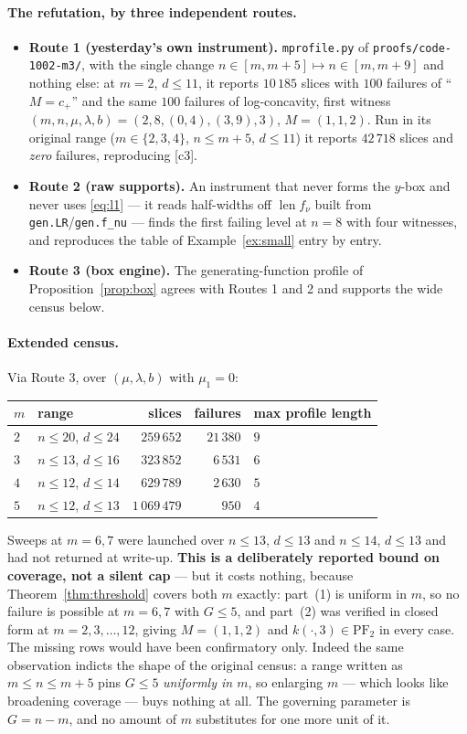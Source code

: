 \documentclass[11pt]{article}
\theoremstyle{definition}
\newcommand{\PFtwo}{\mathrm{PF}_2}
\begin{document}
\paragraph{The refutation, by three independent routes.}
\begin{itemize}
\item \textbf{Route 1 (yesterday's own instrument).} \verb|mprofile.py| of
\verb|proofs/code-1002-m3/|, with the single change $n\in[m,m+5]\mapsto n\in[m,m+9]$ and
nothing else: at $m=2$, $d\le11$, it reports $10\,185$ slices with $100$ failures of
``$M=c_+$'' and the same $100$ failures of log-concavity, first witness
$(m,n,\mu,\lambda,b)=(2,8,(0,4),(3,9),3)$, $M=(1,1,2)$. Run in its original range
($m\in\{2,3,4\}$, $n\le m+5$, $d\le11$) it reports $42\,718$ slices and \emph{zero}
failures, reproducing [c3].
\item \textbf{Route 2 (raw supports).} An instrument that never forms the $y$-box and
never uses \eqref{eq:l1} --- it reads half-widths off $\operatorname{len}f_\nu$ built
from \texttt{gen.LR}/\texttt{gen.f\_nu} --- finds the first failing level at $n=8$ with
four witnesses, and reproduces the table of Example~\ref{ex:small} entry by entry.
\item \textbf{Route 3 (box engine).} The generating-function profile of
Proposition~\ref{prop:box} agrees with Routes 1 and 2 and supports the wide census below.
\end{itemize}

\paragraph{Extended census.} Via Route 3, over $(\mu,\lambda,b)$ with $\mu_1=0$:
\begin{center}
\begin{tabular}{llrrl}
 $m$ & range & slices & failures & max profile length\\\hline
 $2$ & $n\le20$, $d\le24$ & $259\,652$ & $21\,380$ & $9$\\
 $3$ & $n\le13$, $d\le16$ & $323\,852$ & $6\,531$ & $6$\\
 $4$ & $n\le12$, $d\le14$ & $629\,789$ & $2\,630$ & $5$\\
 $5$ & $n\le12$, $d\le13$ & $1\,069\,479$ & $950$ & $4$\\
\end{tabular}
\end{center}
Sweeps at $m=6,7$ were launched over $n\le13$, $d\le13$ and $n\le14$, $d\le13$ and had
not returned at write-up. \textbf{This is a deliberately reported bound on coverage, not a
silent cap} --- but it costs nothing, because Theorem~\ref{thm:threshold} covers both $m$
exactly: part~(1) is uniform in $m$, so no failure is possible at $m=6,7$ with $G\le5$, and
part~(2) was verified in closed form at $m=2,3,\dots,12$, giving $M=(1,1,2)$ and
$k(\cdot,3)\in\PFtwo$ in every case. The missing rows would have been confirmatory only.
Indeed the same observation indicts the shape of the original census: a range written as
$m\le n\le m+5$ pins $G\le5$ \emph{uniformly in $m$}, so enlarging $m$ --- which looks like
broadening coverage --- buys nothing at all. The governing parameter is $G=n-m$, and no
amount of $m$ substitutes for one more unit of it.
\end{document}
